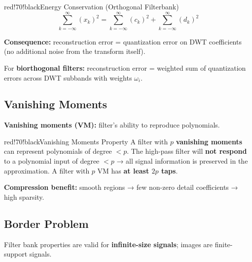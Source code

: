 \begin{calloutbox}{red!70!black}{Energy Conservation (Orthogonal Filterbank)}
\[
\sum_{k=-\infty}^{\infty} (x_k)^2 = \sum_{k=-\infty}^{\infty} (c_k)^2 + \sum_{k=-\infty}^{\infty} (d_k)^2
\]

\textbf{Consequence:} reconstruction error = quantization error on DWT coefficients (no additional noise from the transform itself).
\end{calloutbox}

For \textbf{biorthogonal filters:} reconstruction error = weighted sum of quantization errors across DWT subbands with weights $\omega_i$.

\begin{center}\end{center}

\subsection{Vanishing Moments}

\textbf{Vanishing moments (VM):} filter's ability to reproduce polynomials.

\begin{calloutbox}{red!70!black}{Vanishing Moments Property}
A filter with $p$ \textbf{vanishing moments} can represent polynomials of degree $< p$. The high-pass filter will \textbf{not respond} to a polynomial input of degree $< p$ → all signal information is preserved in the approximation. A filter with $p$ VM has \textbf{at least $2p$ taps}.
\end{calloutbox}

\begin{center}\end{center}

\textbf{Compression benefit:} smooth regions → few non-zero detail coefficients → high sparsity.

\subsection{Border Problem}

Filter bank properties are valid for \textbf{infinite-size signals}; images are finite-support signals.

